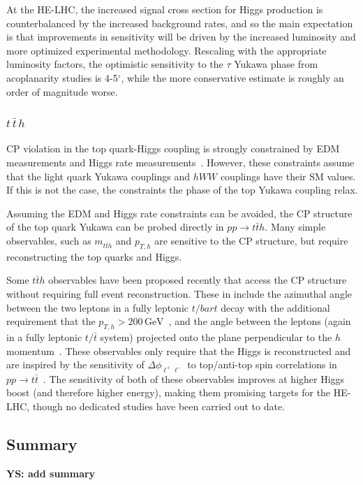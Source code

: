 \documentclass[../report.tex]{subfiles}
\begin{document}
At the HE-LHC, the increased signal cross section for Higgs production
is counterbalanced by the increased background rates, and so the main
expectation is that improvements in sensitivity will be driven by the
increased luminosity and more optimized experimental methodology.
Rescaling with the appropriate luminosity factors, the optimistic
sensitivity to the $\tau$ Yukawa phase from acoplanarity studies is
4-5$^\circ$, while the more conservative estimate is roughly an order
of magnitude worse.

\subsubsection{$ t\,\bar{t}\,h$}

CP violation in the top quark-Higgs coupling is strongly constrained by EDM measurements and Higgs rate measurements~\cite{Brod:2013cka}. However, these constraints assume that the light quark Yukawa couplings and $hWW$ couplings have their SM values. If this is not the case, the constraints the phase of the top Yukawa coupling relax.
    
Assuming the EDM and Higgs rate  constraints can be avoided, the CP structure of the top quark Yukawa can be probed directly in $pp \to t\bar t h$. Many simple observables, such as $m_{t\bar t h}$ and $p_{T,h}$ are sensitive to the CP structure, but require reconstructing the top quarks and Higgs.

Some $t\bar t h$ observables have been proposed recently that access the CP structure without requiring full event reconstruction. These in include the azimuthal angle between the two leptons in a fully leptonic $t/bar{t}$ decay with the additional requirement that the $p_{T,h} > 200\, \text{GeV}$~\cite{Buckley:2015vsa}, and the angle between the leptons (again in a fully leptonic $t/\bar t$ system) projected onto the plane perpendicular to the $h$ momentum~\cite{Boudjema:2015nda}. These observables only require that the Higgs is reconstructed and are inspired by the sensitivity of $\Delta \phi_{\ell^+\ell^-}$ to top/anti-top spin correlations in $pp \to t\bar t$~\cite{Mahlon:1995zn}. The sensitivity of both of these observables improves at higher Higgs boost (and therefore higher energy), making them promising targets for the HE-LHC, though no dedicated studies have been carried out to date.

\subsection{Summary}

{\bf YS: add summary }
\end{document}
